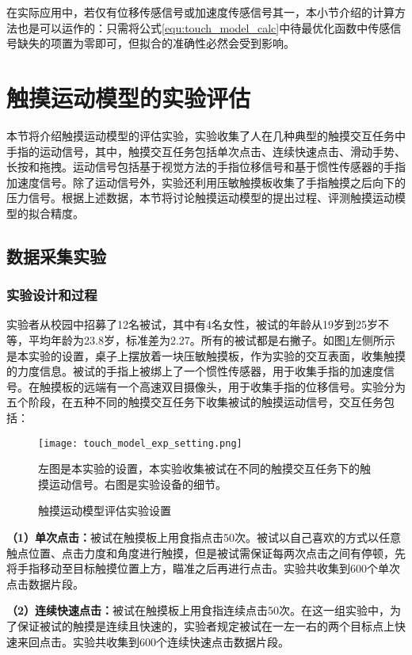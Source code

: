 在实际应用中，若仅有位移传感信号或加速度传感信号其一，本小节介绍的计算方法也是可以运作的：只需将公式\ref{equ:touch_model_calc}中待最优化函数中传感信号缺失的项置为零即可，但拟合的准确性必然会受到影响。

\section{触摸运动模型的实验评估}

本节将介绍触摸运动模型的评估实验，实验收集了人在几种典型的触摸交互任务中手指的运动信号，其中，触摸交互任务包括单次点击、连续快速点击、滑动手势、长按和拖拽。运动信号包括基于视觉方法的手指位移信号和基于惯性传感器的手指加速度信号。除了运动信号外，实验还利用压敏触摸板收集了手指触摸之后向下的压力信号。根据上述数据，本节将讨论触摸运动模型的提出过程、评测触摸运动模型的拟合精度。

\subsection{数据采集实验}

\subsubsection{实验设计和过程}

实验者从校园中招募了12名被试，其中有4名女性，被试的年龄从19岁到25岁不等，平均年龄为23.8岁，标准差为2.27。所有的被试都是右撇子。如图\ref{fig:touch_model_exp_setting}左侧所示是本实验的设置，桌子上摆放着一块压敏触摸板，作为实验的交互表面，收集触摸的力度信息。被试的手指上被绑上了一个惯性传感器，用于收集手指的加速度信号。在触摸板的远端有一个高速双目摄像头，用于收集手指的位移信号。实验分为五个阶段，在五种不同的触摸交互任务下收集被试的触摸运动信号，交互任务包括：

\begin{figure}
	\centering
	\texttt{[image: touch\_model\_exp\_setting.png]}
	\caption*{左图是本实验的设置，本实验收集被试在不同的触摸交互任务下的触摸运动信号。右图是实验设备的细节。}
	\caption{触摸运动模型评估实验设置}
	\label{fig:touch_model_exp_setting}
\end{figure}

\textbf{（1）单次点击：}被试在触摸板上用食指点击50次。被试以自己喜欢的方式以任意触点位置、点击力度和角度进行触摸，但是被试需保证每两次点击之间有停顿，先将手指移动至目标触摸位置上方，瞄准之后再进行点击。实验共收集到600个单次点击数据片段。

\textbf{（2）连续快速点击：}被试在触摸板上用食指连续点击50次。在这一组实验中，为了保证被试的触摸是连续且快速的，实验者规定被试在一左一右的两个目标点上快速来回点击。实验共收集到600个连续快速点击数据片段。


